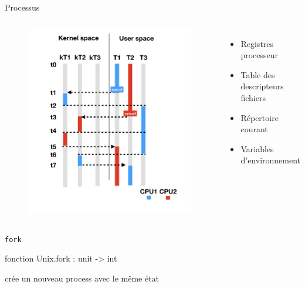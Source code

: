 

\begin{frame}{Processus}

\begin{columns}
\begin{figure}
    \centering
    \includegraphics[width=\textwidth]{slides/images/scheduling.jpg}
\end{figure}



\begin{itemize}[label=$-$]
    \item Registres processeur
    \item Table des descripteurs fichiers
    \item Répertoire courant
    \item Variables d'environnement
\end{itemize}
\end{columns}

\end{frame}

\begin{frame}{\texttt{fork}}
    
    fonction Unix.fork : unit -> int

    crée un nouveau process avec le même état    
\end{frame}



